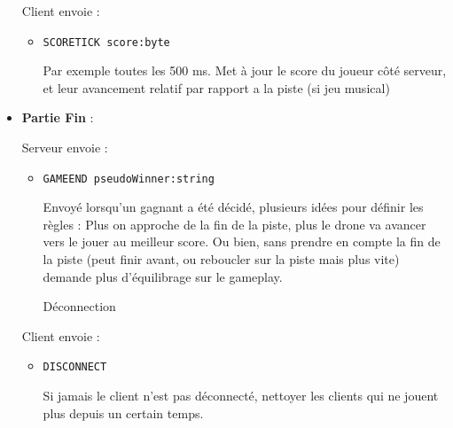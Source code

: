 \begin{itemize}
Client envoie :
\begin{itemize}
\item{\begin{verbatim}SCORETICK score:byte\end{verbatim}
Par exemple toutes les 500 ms. Met à jour le score du joueur côté serveur, et leur avancement relatif par rapport a la piste (si jeu musical)}
\end{itemize}

\item{\textbf{Partie Fin} :}

Serveur envoie :
\begin{itemize}
\item{\begin{verbatim}GAMEEND pseudoWinner:string\end{verbatim}
Envoyé lorsqu'un gagnant a été décidé, plusieurs idées pour définir les règles : Plus on approche de la fin de la piste, plus le drone va avancer vers le jouer au meilleur score. Ou bien, sans prendre en compte la fin de la piste (peut finir avant, ou reboucler sur la piste mais plus vite) demande plus d'équilibrage sur le gameplay.}
Déconnection
\end{itemize}
Client envoie :
\begin{itemize}
\item{\begin{verbatim}DISCONNECT\end{verbatim}
Si jamais le client n'est pas déconnecté, nettoyer les clients qui ne jouent plus depuis un certain temps.}
\end{itemize}
\end{itemize}